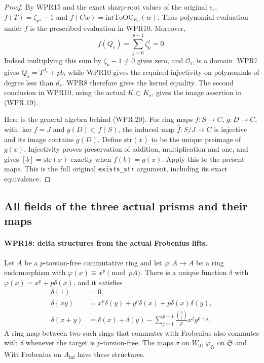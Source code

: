 \documentclass[11pt,a4paper]{article}
\numberwithin{equation}{section}
\theoremstyle{remark}\newtheorem{remark}[theorem]{Remark}
\begin{document}
\begin{proof}
By WPR15 and the exact sharp-root values of the original
$\epsilon_s$, $f(T)=\zeta_{p^s}-1$ and
$f(Cw)=\mathrm{intToOC}_{K_0}(w)$. Thus polynomial evaluation
under $f$ is the prescribed evaluation in WPR10. Moreover,
\[
 f(Q_s)=\sum_{j=0}^{p-1}\zeta_p^j=0.
\]
Indeed multiplying this sum by $\zeta_p-1\neq0$ gives zero,
and $\mathcal O_C$ is a domain. WPR7 gives
$Q_s=T^{d_s}+pb$, while WPR10 gives the required injectivity
on polynomials of degree less than $d_s$. WPR8 therefore gives
the kernel equality. The second conclusion in WPR10, using the
actual $K\subset K_s$, gives the image assertion in (WPR.19).

Here is the general algebra behind (WPR.20). For ring maps
$f:S\to C$, $g:D\to C$, with $\ker f=J$ and
$g(D)\subset f(S)$, the induced map $\bar f:S/J\to C$
is injective and its image contains $g(D)$. Define
$\mathrm{str}(x)$ to be the unique preimage of $g(x)$.
Injectivity proves preservation of addition, multiplication and
one, and gives $[b]=\mathrm{str}(x)$ exactly when $f(b)=g(x)$.
Apply this to the present maps. This is the full original
\texttt{exists\_\allowbreak str} argument, including its exact equivalence.
\end{proof}

\subsection{All fields of the three actual prisms and their maps}

\paragraph{WPR18: delta structures from the actual Frobenius lifts.}
\label{claim:WPR18}
Let $A$ be a $p$-torsion-free commutative ring and let
$\varphi:A\to A$ be a ring endomorphism with
$\varphi(x)\equiv x^p\pmod{pA}$. There is a unique function
$\delta$ with $\varphi(x)=x^p+p\delta(x)$, and it satisfies
\[
 \begin{split}
 \delta(1)&=0,\\
 \delta(xy)&=x^p\delta(y)+y^p\delta(x)+p\delta(x)\delta(y),\\
 \delta(x+y)&=\delta(x)+\delta(y)
       -\sum_{j=1}^{p-1}\frac{\binom pj}{p}x^jy^{p-j}.
 \end{split}                                                       \tag{WPR.21}
\]
A ring map between two such rings that commutes with Frobenius
also commutes with $\delta$ whenever the target is $p$-torsion-free.
The maps $\sigma$ on $W_0$, $\varphi_{\mathfrak S}$ on
$\mathfrak S$ and Witt Frobenius on $A_{\mathrm{inf}}$ have these structures.
\end{document}
